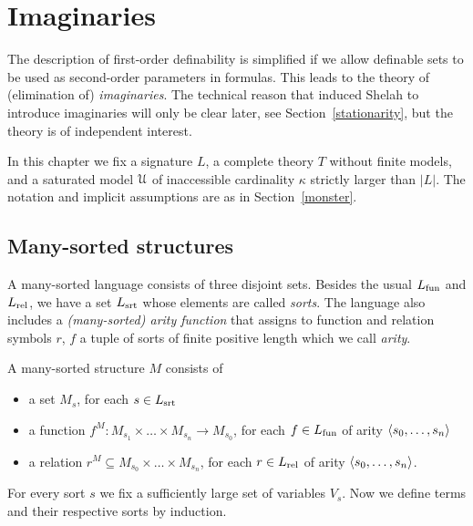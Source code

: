 \chapter{Imaginaries}
\label{imaginary}

\def\medrel#1{\parbox[t]{5ex}{$\displaystyle\hfil #1$}}
\def\ceq#1#2#3{\parbox{15ex}{$\displaystyle #1$}\medrel{#2}$\displaystyle  #3$}

\def\vl{\mr}

The description of first-order definability is simplified if we allow definable sets to be used as second-order parameters in formulas.
This leads to the theory of (elimination of) \textit{imaginaries}.
The technical reason that induced Shelah to introduce imaginaries will only be clear later, see Section~\ref{stationarity}, but the theory is of independent interest.

In this chapter we fix a signature $L$, a complete theory $T$ without finite models, and a saturated model $\EuScript U$ of inaccessible cardinality $\kappa$ strictly larger than $|L|$.
The notation and implicit assumptions are as in Section~\ref{monster}.

\section{Many-sorted structures}
\label{many-sorted}
\def\Ar{{\rm Ar}}

A many-sorted language consists of three disjoint sets.
Besides the usual $L_{\rm fun}$ and $L_{\rm rel}$, we have a set $L_{\rm srt}$  whose elements are called \emph{sorts}.
The language also includes a \emph{(many-sorted) arity function} that assigns to function and relation symbols $r$, $f$ a tuple of sorts of finite positive length which we call \emph{arity}.

A many-sorted structure $M$ consists of
\begin{itemize}
\item[1.] a set $M_s$, for each $s\in L_{\rm srt}$
\item[2.] a function $f^M:M_{s_1}\times\dots\times M_{s_n}\to M_{s_0}$, for each $f\in L_{\rm fun}$ of arity $\langle s_0,\dots,s_n\rangle$
\item[3.] a relation $r^M\subseteq M_{s_0}\times\dots\times M_{s_n}$, for each $r\in L_{\rm rel}$ of arity $\langle s_0,\dots,s_n\rangle$.
\end{itemize}

For every sort $s$ we fix a sufficiently large set of variables $V_s$.
Now we define terms and their respective sorts by induction.

